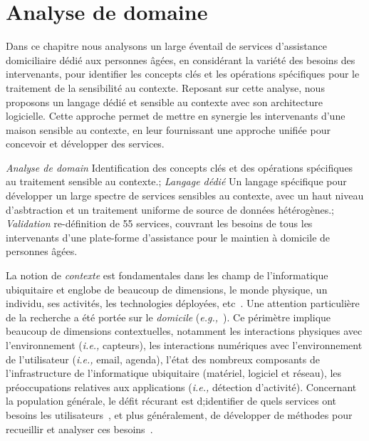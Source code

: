 \chapter{Analyse de domaine}
\begin{preamble}
Dans ce chapitre nous analysons un large éventail de services d'assistance domiciliaire dédié aux personnes âgées, en considérant la variété des besoins des intervenants, pour identifier les concepts clés et les opérations spécifiques pour le traitement de la sensibilité au contexte. Reposant sur cette analyse, nous proposons un langage dédié et sensible au contexte avec son architecture logicielle. Cette approche permet de mettre en synergie les intervenants d'une maison sensible au contexte, en leur fournissant une approche unifiée pour concevoir et développer des services.
\end{preamble}
{
{\em Analyse de domain} Identification des concepts clés et des opérations spécifiques au traitement sensible au contexte.;
{\em Langage dédié} Un langage spécifique pour développer un large spectre de services sensibles au contexte, avec un haut niveau d'asbtraction et un traitement uniforme de source de données hétérogènes.;
{\em Validation} re-définition de 55 services, couvrant les besoins de tous les intervenants d'une plate-forme d'assistance pour le maintien à domicile de personnes âgées.
}


La notion de {\em contexte} est fondamentales dans les champ de l'informatique ubiquitaire et englobe de beaucoup de dimensions, le monde physique, un individu, ses activités, les technologies déployées, etc~\cite{bauer2012comparison}.
Une attention particulière de la recherche a été portée sur le {\em domicile} ({\em e.g.,}~\cite{cook2013casas,feminella2014piloteur}). Ce périmètre implique beaucoup de dimensions contextuelles, notamment les interactions physiques avec l'environnement ({\em i.e.,} capteurs), les interactions numériques avec l'environnement de l'utilisateur ({\em i.e.,} email, agenda), l'état des nombreux composants de l'infrastructure de l'informatique ubiquitaire (matériel, logiciel et réseau), les préoccupations relatives aux applications ({\em i.e.,} détection d'activité). Concernant la population générale, le défit récurant est d;identifier de quels services ont besoins les utilisateurs~\cite{brush2011home}, et plus généralement, de développer de méthodes pour recueillir et analyser ces besoins~\cite{coutaz2010disqo}.

